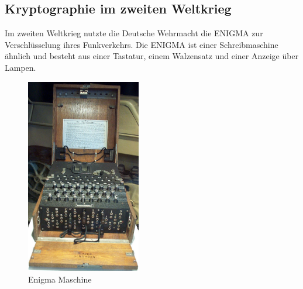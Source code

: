 \subsection{Kryptographie im zweiten Weltkrieg}
Im zweiten Weltkrieg nutzte die Deutsche Wehrmacht die ENIGMA zur Verschlüsselung ihres Funkverkehrs. Die ENIGMA ist einer Schreibmaschine ähnlich und besteht aus einer Tastatur, einem Walzensatz und einer Anzeige über Lampen. 
%
\begin{figure}[ht]
\begin{center}
\includegraphics[width=5cm]{images/Enigma_Verkehrshaus_Luzern_cropped.jpg}
\caption{Enigma Maschine}
\end{center}
\end{figure}
%
